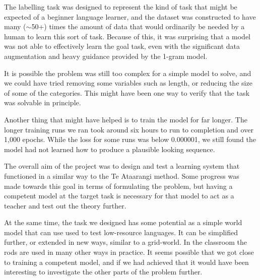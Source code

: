 The labelling task was designed to represent the kind of task that might be expected of a beginner language learner, and the dataset was constructed to have many ($\sim$50+) times the amount of data that would ordinarily be needed by a human to learn this sort of task. Because of this, it was surprising that a model was not able to effectively learn the goal task, even with the significant data augmentation and heavy guidance provided by the 1-gram model.

It is possible the problem was still too complex for a simple model to solve, and we could have tried removing some variables such as length, or reducing the size of some of the categories. This might have been one way to verify that the task was solvable in principle.

Another thing that might have helped is to train the model for far longer. The longer training runs we ran took around six hours to run to completion and over 1,000 epochs. While the loss for some runs was below 0.000001, we still found the model had not learned how to produce a plausible looking sequence.

The overall aim of the project was to design and test a learning system that functioned in a similar way to the Te Ataarangi method. Some progress was made towards this goal in terms of formulating the problem, but having a competent model at the target task is necessary for that model to act as a teacher and test out the theory further.

At the same time, the task we designed has some potential as a simple world model that can use used to test low-resource languages. It can be simplified further, or extended in new ways, similar to a grid-world. In the classroom the rods are used in many other ways in practice. It seems possible that we got close to training a competent model, and if we had achieved that it would have been interesting to investigate the other parts of the problem further.
